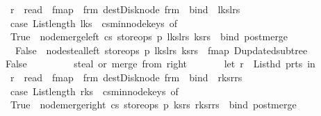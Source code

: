 \begin{isabellebody}
\ \ \ \ \ \ r\ {\isacharbar}{\isachargreater}\ read\ {\isacharbar}{\isachargreater}\ fmap\ {\isacharparenleft}{\isacharpercent}\ frm{\isachardot}\ dest{\isacharunderscore}Disk{\isacharunderscore}node\ frm{\isacharparenright}\ {\isacharbar}{\isachargreater}\ bind\ {\isacharparenleft}{\isacharpercent}\ {\isacharparenleft}l{\isacharunderscore}ks{\isacharcomma}l{\isacharunderscore}rs{\isacharparenright}{\isachardot}\ \isanewline
\ \ \ \ \ \ case\ List{\isachardot}length\ l{\isacharunderscore}ks\ {\isacharequal}\ cs{\isacharbar}{\isachargreater}min{\isacharunderscore}node{\isacharunderscore}keys\ of\isanewline
\ \ \ \ \ \ True\ {\isasymRightarrow}\ node{\isacharunderscore}merge{\isacharunderscore}left\ cs\ store{\isacharunderscore}ops\ p\ {\isacharparenleft}l{\isacharunderscore}ks{\isacharcomma}l{\isacharunderscore}rs{\isacharparenright}\ {\isacharparenleft}ks{\isacharcomma}rs{\isacharparenright}\ {\isacharbar}{\isachargreater}\ bind\ post{\isacharunderscore}merge\isanewline
\ \ \ \ \ \ {\isacharbar}\ False\ {\isasymRightarrow}\ node{\isacharunderscore}steal{\isacharunderscore}left\ store{\isacharunderscore}ops\ p\ {\isacharparenleft}l{\isacharunderscore}ks{\isacharcomma}l{\isacharunderscore}rs{\isacharparenright}\ {\isacharparenleft}ks{\isacharcomma}rs{\isacharparenright}\ {\isacharbar}{\isachargreater}\ fmap\ D{\isacharunderscore}updated{\isacharunderscore}subtree{\isacharparenright}{\isacharparenright}\isanewline
\ \ \ \ {\isacharbar}\ False\ {\isasymRightarrow}\ {\isacharparenleft}\isanewline
\ \ \ \ \ \ {\isacharparenleft}{\isacharasterisk}\ steal\ or\ merge\ from\ right\ {\isacharasterisk}{\isacharparenright}\isanewline
\ \ \ \ \ \ let\ r\ {\isacharequal}\ List{\isachardot}hd\ {\isacharparenleft}p{\isacharbar}{\isachargreater}r{\isacharunderscore}ts{}{\isacharparenright}\ in\isanewline
\ \ \ \ \ \ r\ {\isacharbar}{\isachargreater}\ read\ {\isacharbar}{\isachargreater}\ fmap\ {\isacharparenleft}{\isacharpercent}\ frm{\isachardot}\ dest{\isacharunderscore}Disk{\isacharunderscore}node\ frm{\isacharparenright}\ {\isacharbar}{\isachargreater}\ bind\ {\isacharparenleft}{\isacharpercent}\ {\isacharparenleft}r{\isacharunderscore}ks{\isacharcomma}r{\isacharunderscore}rs{\isacharparenright}{\isachardot}\ \isanewline
\ \ \ \ \ \ case\ List{\isachardot}length\ r{\isacharunderscore}ks\ {\isacharequal}\ cs{\isacharbar}{\isachargreater}min{\isacharunderscore}node{\isacharunderscore}keys\ of\isanewline
\ \ \ \ \ \ True\ {\isasymRightarrow}\ node{\isacharunderscore}merge{\isacharunderscore}right\ cs\ store{\isacharunderscore}ops\ p\ {\isacharparenleft}ks{\isacharcomma}rs{\isacharparenright}\ {\isacharparenleft}r{\isacharunderscore}ks{\isacharcomma}r{\isacharunderscore}rs{\isacharparenright}\ {\isacharbar}{\isachargreater}\ bind\ post{\isacharunderscore}merge\isanewline

\end{isabellebody}
